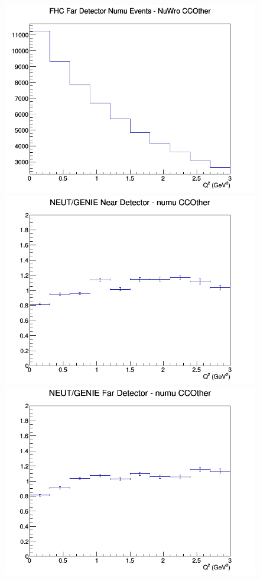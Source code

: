 \documentclass[12pt]{article}
\begin{document}
\begin{figure}[h]
\endminipage
{}
\includegraphics[width=\linewidth]{eff_Q2/LAr/CCOther_FHC_FD_numu_Q2_NuWro.png}
\endminipage
\newline
{}
\includegraphics[width=\linewidth]{eff_Q2/LAr/ratios/CCOther_NEUT_GENIE_numu_near_Q2.png}
\endminipage
{}
\includegraphics[width=\linewidth]{eff_Q2/LAr/ratios/CCOther_NEUT_GENIE_numu_far_Q2.png}

\end{figure}
\end{document}
